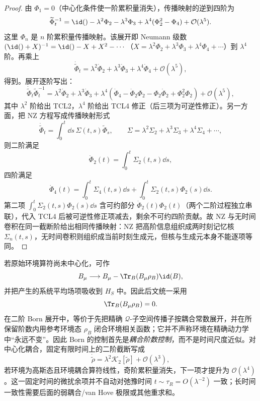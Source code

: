 \begin{proof}
由 $\Phi_1=0$（中心化条件使一阶累积量消失），传播映射的逆到四阶为
\[
\widetilde\Phi_t^{-1}
=\id()-\lambda^2\Phi_2-\lambda^3\Phi_3
+\lambda^4(\Phi_2^2-\Phi_4)+\mathcal O(\lambda^5).
\]
这里 \(\Phi_n\) 是 \(n\) 阶累积量传播映射。该展开即 Neumann 级数 \((\id()+X)^{-1}=\id()-X+X^2-\cdots\)（\(X=\lambda^2\Phi_2+\lambda^3\Phi_3+\lambda^4\Phi_4+\cdots\)）到 \(\lambda^4\) 阶。再乘上
\[
\dot{\widetilde\Phi}_t
=\lambda^2\dot\Phi_2+\lambda^3\dot\Phi_3
+\lambda^4\dot\Phi_4+\mathcal O(\lambda^5),
\]
得到。展开逐阶写出：
\[
 \dot{\widetilde\Phi}_t\widetilde\Phi_t^{-1}
 =\lambda^2\dot\Phi_2
 +\lambda^3\dot\Phi_3
 +\lambda^4(\dot\Phi_4-\dot\Phi_2\Phi_2-\Phi_2\dot\Phi_2+\Phi_2^2\Phi_2)
 +\mathcal O(\lambda^5),
\]
其中 \(\lambda^2\) 阶给出 TCL2，\(\lambda^4\) 阶给出 TCL4 修正（后三项为可逆性修正）。另一方面，把 NZ 方程写成传播映射形式
\[
\dot{\widetilde\Phi}_t
=\int_0^t\dd s\,\Sigma(t,s)\widetilde\Phi_s,
\qquad
\Sigma=\lambda^2\Sigma_2+\lambda^3\Sigma_3+\lambda^4\Sigma_4+\cdots,
\]
则二阶满足
\[
\dot\Phi_2(t)=\int_0^t\Sigma_2(t,s)\dd s,
\]
四阶满足
\[
\dot\Phi_4(t)
=\int_0^t\Sigma_4(t,s)\dd s
+\int_0^t\Sigma_2(t,s)\Phi_2(s)\dd s.
\]
第二项 \(\int_0^t\Sigma_2(t,s)\Phi_2(s)\dd s\) 含可约部分 \(\dot\Phi_2(t)\Phi_2(t)\)（两个二阶过程独立串联），代入 TCL4 后被可逆性修正项减去，剩余不可约四阶贡献。故 NZ 与无时间卷积在同一截断阶给出相同传播映射：NZ 把高阶信息组织成两时刻记忆核 \(\Sigma_n(t,s)\)，无时间卷积则组织成当前时刻生成元，但核与生成元本身不能逐项等同。
\end{proof}

若原始环境算符尚未中心化，可作
\[
B_\mu\longrightarrow
B_\mu-\Tr_B(B_\mu\rho_B)\id(B),
\]
并把产生的系统平均场项吸收到 \(H_S\) 中。因此后文统一采用
\begin{equation}
\Tr_B(B_\mu\rho_B)=0.
\label{eq:phys-oqs-bath-centered}
\end{equation}
在二阶 Born 展开中，等价于先把精确 $\mathcal Q$-子空间传播子按耦合常数展开，并在所保留阶数内用参考环境态
\(\rho_B\) 闭合环境相关函数；它并不声称环境在精确动力学中“永远不变”。因此 Born 的控制首先是\emph{耦合阶数控制}，而不是时间尺度近似。对中心化耦合，固定有限时间上的二阶截断写成
\[
\dot{\widetilde\rho}=\lambda^2\mathcal K_2[\widetilde\rho]
+\mathcal O(\lambda^3),
\]
若环境为高斯态且环境耦合算符线性，奇阶累积量消失，下一项才提升为 $\mathcal O(\lambda^4)$。这一固定时间的微扰余项并不自动对弛豫时间 $t\sim\tau_R=O(\lambda^{-2})$ 一致；长时间一致性需要后面的弱耦合/van Hove 极限或其他重求和。

